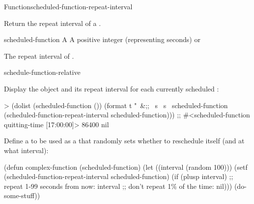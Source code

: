 \begin{functiondoc}{Function}{scheduled-function-repeat-interval}%
  {}
%
%

\fnsyntax

\fnpurpose Return the repeat interval of a .

\fnsetf
{}%
  {}{}

\fnpackage {}

\fnmodule {}

\fnargs
\begin{args}{scheduled-function}
 A 
 A positive integer (representing seconds) or \nil
\end{args}

\fnreturns The repeat interval of . 

\begin{alsos}{schedule-function-relative}
\end{alsos}

%
\fnexamples
% 
Display the  object and its repeat interval for each
currently scheduled :
%
\W\supp
\begin{example}
> (dolist (scheduled-function ())
   (format t "~&;; ~s ~s~%
           scheduled-function
           (scheduled-function-repeat-interval scheduled-function)))
;; #<scheduled-function quitting-time [17:00:00]> 86400
nil
\end{example}

Define a  to be used as a  that
randomly sets whether to reschedule itself (and at what interval):
%
\W\supp
\begin{example}
  (defun complex-function (scheduled-function)
    (let ((interval (random 100)))
      (setf (scheduled-function-repeat-interval scheduled-function)
            (if (plusp interval) 
                ;; repeat 1-99 seconds from now:
                interval
                ;; don't repeat 1\% of the time:
                nil)))
    (do-some-stuff))
\end{example}

\end{functiondoc}

